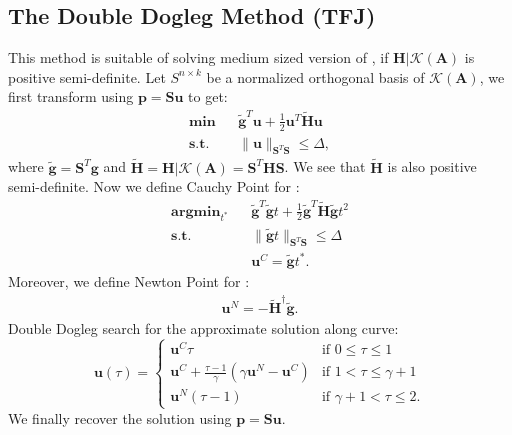 \documentclass[annual]{acmsiggraph}
\newcommand{\E}[1]{\mathbf{#1}}
\begin{document}
\subsection{The Double Dogleg Method (TFJ)}
This method is suitable of solving medium sized version of , if $\E{H}|\mathcal{K}(\E{A})$ is positive semi-definite. Let $S^{n\times k}$ be a normalized orthogonal basis of $\mathcal{K}(\E{A})$, we first transform  using $\E{p}=\E{S}\E{u}$ to get:
\begin{subequations}
\label{pb:TR_PROB_R}
\begin{align}
\E{min}&&\tilde{\E{g}}^T\E{u}+\frac{1}{2}\E{u}^T\tilde{\E{H}}\E{u}	\\
\E{s.t.}&&\|\E{u}\|_{\E{S}^T\E{S}}\leq\Delta,
\end{align}
\end{subequations}
where $\tilde{\E{g}}=\E{S}^T\E{g}$ and $\tilde{\E{H}}=\E{H}|\mathcal{K}(\E{A})=\E{S}^T\E{H}\E{S}$. We see that $\tilde{\E{H}}$ is also positive semi-definite. Now we define Cauchy Point for :
\begin{eqnarray*}
\E{argmin}_{t^*}&&\tilde{\E{g}}^T\tilde{\E{g}}t+\frac{1}{2}\tilde{\E{g}}^T\tilde{\E{H}}\tilde{\E{g}}t^2	\\
\E{s.t.}&&\|\tilde{\E{g}}t\|_{\E{S}^T\E{S}}\leq\Delta	\\
&&\E{u}^C=\tilde{\E{g}}t^*.
\end{eqnarray*}
Moreover, we define Newton Point for :
\begin{eqnarray*}
\E{u}^N=-\tilde{\E{H}}^\dagger\tilde{\E{g}}.
\end{eqnarray*}
Double Dogleg search for the approximate solution along curve:
\begin{equation*}
\E{u}(\tau)=
\begin{cases}
   \E{u}^C\tau & \text{if } 0 \leq \tau \leq 1 \\
   \E{u}^C+\frac{\tau-1}{\gamma}(\gamma\E{u}^N-\E{u}^C) & \text{if } 1 < \tau \leq \gamma+1	\\
   \E{u}^N(\tau-1) & \text{if } \gamma+1 < \tau \leq 2.
\end{cases}
\end{equation*}
We finally recover the solution using $\E{p}=\E{S}\E{u}$. 
\end{document}
